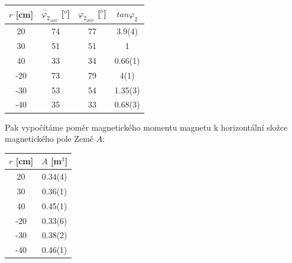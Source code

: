 \documentclass[a4paper,11pt]{article}
\begin{document}
    \begin{minipage}[t]{0.5\textwidth} 
            \par \centering
            \begin{tabular}{|c|c|c|c|}
                    \hline
                    $r$ [cm] & $\varphi_2_{zakl}$ [$^o$] & $\varphi_2_{otoč}$ [$^o$] & $tan\varphi_2$ \\
                    \hline
                    20 & 74 & 77 & 3.9(4) \\
                    \hline
                    30 & 51 & 51 & 1 \\
                    \hline
                    40 & 33 & 34 & 0.66(1) \\
                    \hline
                    -20 & 73 & 79 & 4(1) \\
                    \hline
                    -30 & 53 & 54 & 1.35(3) \\
                    \hline
                    -40 & 35 & 33 & 0.68(3) \\
                    \hline
                \end{tabular}
                \captionsetup{justification=centering, font=footnotesize}
                \vspace{20pt}
                \raggedright
            Pak vypočítáme poměr magnetického momentu magnetu k horizontální složce magnetického pole Země $A$:
            \vspace{20pt}
            \par \centering
            \begin{tabular}{|c|c|}
                    \hline
                    $r$ [cm] & $A$ [m$^3$] \\
                    \hline
                    20 & 0.34(4)\\
                    \hline
                    30 & 0.36(1)\\
                    \hline
                    40 & 0.45(1)\\
                    \hline
                    -20 & 0.33(6)\\
                    \hline
                    -30 & 0.38(2)\\
                    \hline
                    -40 & 0.46(1)\\
                    \hline
                \end{tabular}
                \captionsetup{justification=centering, font=footnotesize}

\end{minipage}
\end{document}
